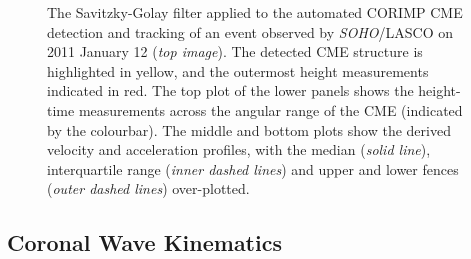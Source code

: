 \documentclass[referee]{aa}
\begin{document}
\begin{figure}[!t]
\caption{The Savitzky-Golay filter applied to the automated CORIMP CME detection and tracking of an event observed by \emph{SOHO}/LASCO on 2011 January 12 (\emph{top image}). The detected CME structure is highlighted in yellow, and the outermost height measurements indicated in red. The top plot of the lower panels shows the height-time measurements across the angular range of the CME (indicated by the colourbar). The middle and bottom plots show the derived velocity and acceleration profiles, with the median (\emph{solid line}), interquartile range (\emph{inner dashed lines}) and upper and lower fences (\emph{outer dashed lines}) over-plotted.}
\label{fig_savgol_CME_CORIMP}
\end{figure}


\subsection{Coronal Wave Kinematics}
\label{subsect:corpita}
\end{document}
